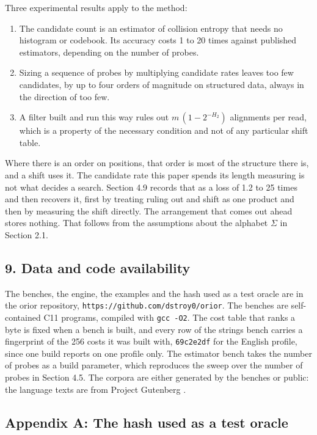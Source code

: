 Three experimental results apply to the method:

\begin{enumerate}
  \item The candidate count is an estimator of collision entropy that needs no histogram or
    codebook. Its accuracy costs 1 to 20 times against published estimators, depending on the
    number of probes.
  \item Sizing a sequence of probes by multiplying candidate rates leaves too few candidates, by up
    to four orders of magnitude on structured data, always in the direction of too few.
  \item A filter built and run this way rules out \(m\,(1 - 2^{-H_2})\) alignments per read, which
    is a property of the necessary condition and not of any particular shift table.
\end{enumerate}

Where there is an order on positions, that order is most of the structure there is, and a shift uses it. The candidate rate this paper spends its length measuring is not what decides a search. Section 4.9 records that as a loss of 1.2 to 25 times and then recovers it, first by treating ruling out and shift as one product and then by measuring the shift directly. The arrangement that comes out ahead stores nothing. That follows from the assumptions about the alphabet \(\Sigma\) in Section 2.1.

\subsection{9. Data and code availability}

The benches, the engine, the examples and the hash used as a test oracle are in the orior repository, \texttt{https://github.com/dstroy0/orior}. The benches are self-contained C11 programs, compiled with \texttt{gcc -O2}. The cost table that ranks a byte is fixed when a bench is built, and every row of the strings bench carries a fingerprint of the 256 costs it was built with, \texttt{69c2e2df} for the English profile, since one build reports on one profile only. The estimator bench takes the number of probes as a build parameter, which reproduces the sweep over the number of probes in Section 4.5. The corpora are either generated by the benches or public: the language texts are from Project Gutenberg \cite{src:Project-Gutenberg}.

\subsection{Appendix A: The hash used as a test oracle}

